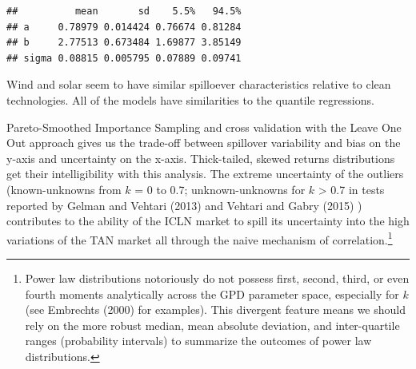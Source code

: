 \documentclass{article}
\newenvironment{Shaded}{\begin{snugshade}}{\end{snugshade}}
\newcommand{\AttributeTok}[1]{\textcolor[rgb]{0.77,0.63,0.00}{#1}}
\newcommand{\CommentTok}[1]{\textcolor[rgb]{0.56,0.35,0.01}{\textit{#1}}}
\newcommand{\DecValTok}[1]{\textcolor[rgb]{0.00,0.00,0.81}{#1}}
\newcommand{\FunctionTok}[1]{\textcolor[rgb]{0.00,0.00,0.00}{#1}}
\newcommand{\NormalTok}[1]{#1}
\newcommand{\OtherTok}[1]{\textcolor[rgb]{0.56,0.35,0.01}{#1}}
\newcommand{\SpecialCharTok}[1]{\textcolor[rgb]{0.00,0.00,0.00}{#1}}
\begin{document}
\begin{Shaded}
\end{Shaded}

\begin{verbatim}
##          mean       sd    5.5%   94.5%
## a     0.78979 0.014424 0.76674 0.81284
## b     2.77513 0.673484 1.69877 3.85149
## sigma 0.08815 0.005795 0.07889 0.09741
\end{verbatim}

Wind and solar seem to have similar spilloever characteristics relative
to clean technologies. All of the models have similarities to the
quantile regressions.

Pareto-Smoothed Importance Sampling and cross validation with the Leave
One Out approach gives us the trade-off between spillover variability
and bias on the y-axis and uncertainty on the x-axis. Thick-tailed,
skewed returns distributions get their intelligibility with this
analysis. The extreme uncertainty of the outliers (known-unknowns from
\(k\) = 0 to 0.7; unknown-unknowns for \(k\) \textgreater{} 0.7 in tests
reported by Gelman and Vehtari (2013) and Vehtari and Gabry (2015) )
contributes to the ability of the ICLN market to spill its uncertainty
into the high variations of the TAN market all through the naive
mechanism of correlation.\footnote{Power law distributions notoriously
  do not possess first, second, third, or even fourth moments
  analytically across the GPD parameter space, especially for \(k\) (see
  Embrechts (2000) for examples). This divergent feature means we should
  rely on the more robust median, mean absolute deviation, and
  inter-quartile ranges (probability intervals) to summarize the
  outcomes of power law distributions.}
\end{document}
